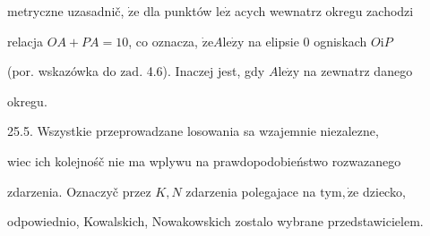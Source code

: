 \documentclass[a4paper,12pt]{article}
\begin{document}
metryczne uzasadnič, $\dot{\mathrm{z}}\mathrm{e}$ dla punktów $\mathrm{l}\mathrm{e}\dot{\mathrm{z}}$ acych wewnatrz okregu zachodzi

relacja $OA+PA=10$, co oznacza, $\dot{\mathrm{z}}\mathrm{e}A\mathrm{l}\mathrm{e}\dot{\mathrm{z}}\mathrm{y}$ na elipsie $0$ ogniskach $O\mathrm{i}P$

(por. wskazówka do $\mathrm{z}\mathrm{a}\mathrm{d}$. 4.6). Inaczej jest, gdy $A\mathrm{l}\mathrm{e}\dot{\mathrm{z}}\mathrm{y}$ na zewnatrz danego

okregu.

25.5. Wszystkie przeprowadzane losowania sa wzajemnie niezalezne,

wiec ich kolejnośč nie ma wplywu na prawdopodobieństwo rozwazanego

zdarzenia. Oznaczyč przez $K, N$ zdarzenia polegajace na $\mathrm{t}\mathrm{y}\mathrm{m}, \dot{\mathrm{z}}\mathrm{e}$ dziecko,

odpowiednio, Kowalskich, Nowakowskich zostalo wybrane przedstawicielem.
\end{document}
